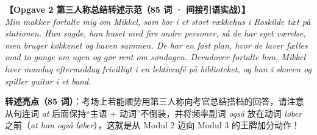 \begin{answerbox}
\textbf{\color{NCDTeal}【Opgave 2 第三人称总结转述示范（85 词 · 间接引语实战）】}\\
\textit{Min makker fortalte mig om Mikkel, som bor i et stort rækkehus i Roskilde tæt på stationen. Hun sagde,  han  huset med fire andre personer, så de har eget værelse, men bruger køkkenet og haven sammen. De har en fast plan, hvor de laver fælles mad to gange om ugen og gør rent om søndagen. Derudover fortalte hun,  Mikkel hver mandag eftermiddag  frivilligt i en lektiecafé på biblioteket, og  han  i skoven og spiller guitar i et band.}

\vspace{0.2em}
\small\textbf{转述亮点（85 词）}：考场上若能顺势用第三人称向考官总结搭档的回答，请注意从句连词 \textit{at} 后面保持“主语 + 动词”不倒装，并将频率副词 \textit{også} 放在动词 \textit{løber} 之前（\textit{at han også løber}），这就是从 Modul 2 迈向 Modul 3 的王牌加分动作！
\end{answerbox}
